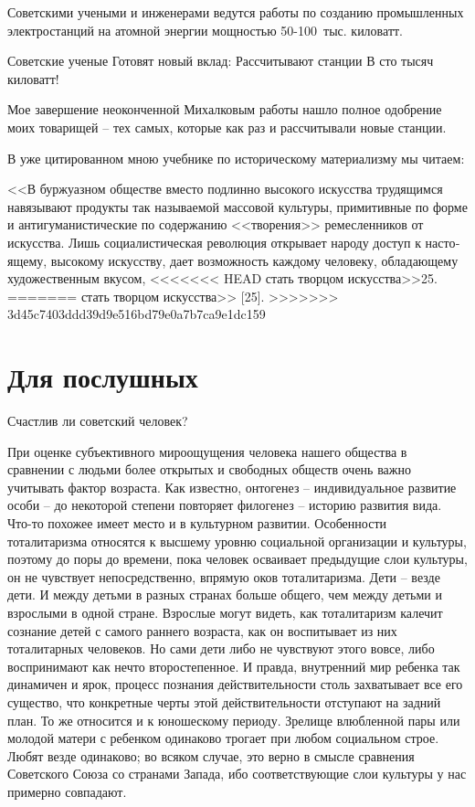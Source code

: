 \documentclass{book}
\begin{document}
\begin{minipage}{0.4\textwidth}
Советскими учеными и инженерами ведутся работы по созданию промышленных электростанций на атомной энергии мощностью 50-100~тыс. киловатт.
\end{minipage}
\hfill
\begin{minipage}{0.4\textwidth}
Советские ученые
Готовят новый вклад:
Рассчитывают станции
В сто тысяч киловатт!
\end{minipage}

Мое завершение неоконченной Михалковым работы нашло полное одобрение моих товарищей -- тех самых, которые как раз и рассчитывали 
новые станции.

В уже цитированном мною учебнике по историческому материализму мы читаем:

<<В буржуазном обществе вместо подлинно высокого искусства трудящимся навязывают продукты так называемой массовой культуры, 
примитивные по форме и антигуманистические по содержанию <<творения>> ремесленников от искусства. Лишь социалистическая революция 
открывает народу доступ к насто­ящему, высокому искусству, дает возможность каждому чело­веку, обладающему художественным вкусом, 
<<<<<<< HEAD
стать творцом искусства>>25.
=======
стать творцом искусства>> [25].
>>>>>>> 3d45c7403ddd39d9e516bd79e0a7b7ca9e1dc159


\section{Для послушных}

Счастлив ли советский человек?

При оценке субъективного мироощущения человека нашего общества в сравнении с людьми более открытых и свободных обществ очень 
важно учитывать фактор возраста. Как известно, онтогенез -- индивидуальное развитие особи -- до некоторой степени повторяет 
филогенез -- историю развития вида. Что-то похожее имеет место и в культурном развитии. Особен­ности тоталитаризма относятся к 
высшему уровню социальной организации и культуры, поэтому до поры до времени, пока человек осваивает предыдущие слои культуры, 
он не чувствует непосредственно, впрямую оков тоталитаризма. Дети -- везде дети. И между детьми в разных странах больше общего, 
чем между детьми и взрослыми в одной стране. Взрослые могут видеть, как тоталитаризм калечит сознание детей с самого раннего 
возраста, как он воспитывает из них тоталитарных человеков. Но сами дети либо не чувствуют этого вовсе, либо воспринимают как 
нечто второстепенное. И правда, внутренний мир ребенка так динамичен и ярок, процесс познания действительности столь захватывает 
все его существо, что конкретные черты этой действительности отступают на задний план. То же относится и к юношескому периоду. 
Зрелище влюбленной пары или молодой матери с ребенком одинаково трогает при любом социальном строе. Любят везде одинаково; во 
всяком случае, это верно в смысле сравнения Советского Союза со странами Запада, ибо соответствующие слои культуры у нас 
примерно совпадают.
\end{document}
